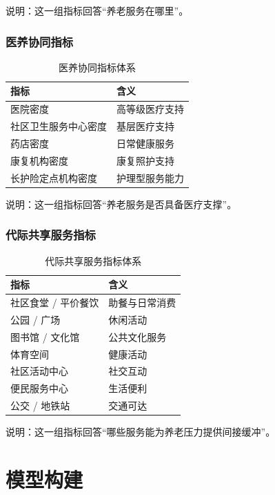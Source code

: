 \documentclass[UTF8,zihao=-4,a4paper,fontset=none]{ctexart}
\begin{document}
说明：这一组指标回答“养老服务在哪里”。

\subsubsection{医养协同指标}

\begin{table}[H]
\centering
\caption{医养协同指标体系}
\begin{tabular}{ll}
\toprule
\rowcolor{tablehead}
指标 & 含义 \\
\midrule
医院密度 & 高等级医疗支持 \\
社区卫生服务中心密度 & 基层医疗支持 \\
药店密度 & 日常健康服务 \\
康复机构密度 & 康复照护支持 \\
长护险定点机构密度 & 护理型服务能力 \\
\bottomrule
\end{tabular}
\end{table}

说明：这一组指标回答“养老服务是否具备医疗支撑”。

\subsubsection{代际共享服务指标}

\begin{table}[H]
\centering
\caption{代际共享服务指标体系}
\begin{tabular}{ll}
\toprule
\rowcolor{tablehead}
指标 & 含义 \\
\midrule
社区食堂 / 平价餐饮 & 助餐与日常消费 \\
公园 / 广场 & 休闲活动 \\
图书馆 / 文化馆 & 公共文化服务 \\
体育空间 & 健康活动 \\
社区活动中心 & 社交互动 \\
便民服务中心 & 生活便利 \\
公交 / 地铁站 & 交通可达 \\
\bottomrule
\end{tabular}
\end{table}

说明：这一组指标回答“哪些服务能为养老压力提供间接缓冲”。

\section{模型构建}
\end{document}
